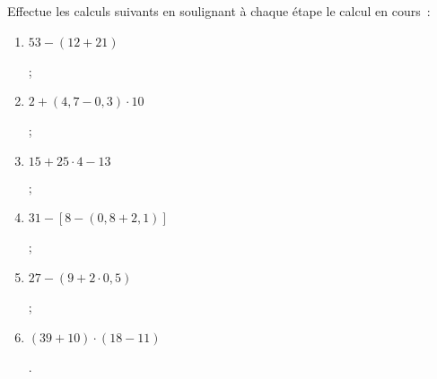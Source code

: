 \begin{exercice}
Effectue les calculs suivants en soulignant à chaque étape le calcul en cours :
\begin{enumerate}
 \item $53 - (12 + 21)$ \dotfill	
 
 \dotfill ;
	
 \item $2 + (4,7 - 0,3) \cdot 10$ \dotfill	

 \dotfill	

 \dotfill ;
	
 \item $15 + 25 \cdot 4 - 13$ \dotfill          	

 \dotfill

 \dotfill ;
	
 \item $31 - [8 - (0,8 + 2,1)]$ \dotfill
	
 \dotfill	

 \dotfill ;
	
 \item $27 - (9 + 2 \cdot 0,5)$ \dotfill	

 \dotfill	

 \dotfill ;
	
 \item $(39 + 10) \cdot (18 - 11)$ \dotfill
 
 \dotfill	

 \dotfill.
\end{enumerate}
\end{exercice}


